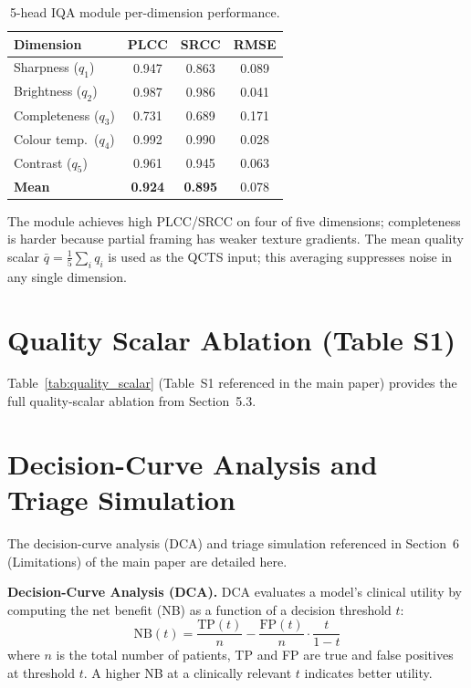 \documentclass{bmvc2k}
\newcommand{\qbar}{\bar{q}}
\begin{document}
\begin{table}[h]
\centering
\caption{5-head IQA module per-dimension performance.}
\label{tab:iqa_perf}
\begin{tabular}{lccc}
\toprule
Dimension & PLCC & SRCC & RMSE \\
\midrule
Sharpness ($q_1$)        & 0.947 & 0.863 & 0.089 \\
Brightness ($q_2$)       & 0.987 & 0.986 & 0.041 \\
Completeness ($q_3$)     & 0.731 & 0.689 & 0.171 \\
Colour temp.\ ($q_4$)    & 0.992 & 0.990 & 0.028 \\
Contrast ($q_5$)         & 0.961 & 0.945 & 0.063 \\
\midrule
\textbf{Mean}            & \textbf{0.924} & \textbf{0.895} & 0.078 \\
\bottomrule
\end{tabular}
\end{table}

The module achieves high PLCC/SRCC on four of five dimensions; completeness is harder because partial framing has weaker texture gradients. The mean quality scalar $\qbar = \frac{1}{5}\sum_i q_i$ is used as the QCTS input; this averaging suppresses noise in any single dimension.

\section{Quality Scalar Ablation (Table S1)}
\label{app:quality_scalar}

Table~\ref{tab:quality_scalar} (Table~S1 referenced in the main paper) provides the full quality-scalar ablation from Section~5.3.



\section{Decision-Curve Analysis and Triage Simulation}
\label{app:dca}

The decision-curve analysis (DCA) and triage simulation referenced in Section~6 (Limitations) of the main paper are detailed here.

\textbf{Decision-Curve Analysis (DCA).}
DCA evaluates a model's clinical utility by computing the net benefit (NB) as a function of a decision threshold $t$:
\[
\text{NB}(t) = \frac{\text{TP}(t)}{n} - \frac{\text{FP}(t)}{n} \cdot \frac{t}{1 - t}
\]
where $n$ is the total number of patients, TP and FP are true and false positives at threshold $t$. A higher NB at a clinically relevant $t$ indicates better utility.
\end{document}
